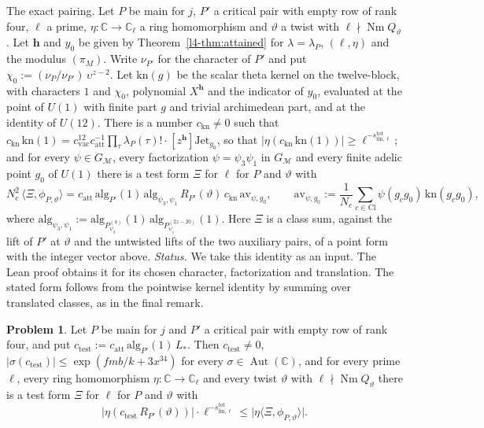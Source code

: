 \documentclass[reqno]{amsart}
\theoremstyle{definition}
\newtheorem{problem}{Problem}[section]
\theoremstyle{plain}
\theoremstyle{remark}
\newcommand{\C}{\mathbb{C}}
\newcommand{\Aut}{\operatorname{Aut}}
\newcommand{\Nm}{\operatorname{Nm}}
\newcommand{\alg}{\mathrm{alg}}
\newcommand{\stot}[1]{s^{\mathrm{tot}}_{\mathrm{fin},#1}}
\newcommand{\ctest}{c_{\mathrm{test}}}
\newcommand{\catt}{c_{\mathrm{att}}}
\newcommand{\cvac}{c_{\mathrm{vac}}}
\newcommand{\Jet}{\mathrm{Jet}}
\newcommand{\Cl}{\mathrm{Cl}}
\newcommand{\Gm}{G_{\mathcal M}}
\newcommand{\hb}{{\mathbf{h}}}
\begin{document}
The exact pairing.  Let \(P\) be main for \(j\), \(P'\) a critical pair with empty row of rank four, \(\ell\) a prime, \(\eta\colon\C\to\C_\ell\) a ring homomorphism and \(\vartheta\) a twist with \(\ell \nmid \Nm Q_\vartheta\).  Let \(\hb\) and \(y_0\) be given by Theorem~\ref{l4-thm:attained} for \(\lambda = \lambda_P\), \((\ell, \eta)\) and the modulus \((\pi_M)\).  Write \(\nu_{P'}\) for the character of \(P'\) and put \(\chi_0 := (\nu_P/\nu_{P'})\,\upsilon^{z-2}\).  Let \(\mathrm{kn}(g)\) be the scalar theta kernel on the twelve-block, with characters \(1\) and \(\chi_0\), polynomial \(X^\hb\) and the indicator of \(y_0\), evaluated at the point of \(U(1)\) with finite part \(g\) and trivial archimedean part, and at the identity of \(U(12)\).  There is a number \(c_{\mathrm{kn}} \ne 0\) such that \(c_{\mathrm{kn}}\,\mathrm{kn}(1) = \cvac^{12}\catt^{-1}\prod_\tau\lambda_P(\tau)!\cdot[z^\hb]\Jet_{y_0}\), so that \(\lvert\eta(c_{\mathrm{kn}}\,\mathrm{kn}(1))\rvert \ge \ell^{-\stot\ell}\); and for every \(\psi \in \Gm\), every factorization \(\psi = \psi_3\psi_1\) in \(\Gm\) and every finite adelic point \(g_0\) of \(U(1)\) there is a test form \(\Xi\) for \(\ell\) for \(P\) and \(\vartheta\) with
\[
  N_c^2\,\langle\Xi, \phi_{P,\vartheta}\rangle = \catt\,\alg_{P'}(1)\,\alg_{\psi_3,\psi_1}\,R_{P'}(\vartheta)\,c_{\mathrm{kn}}\,\mathrm{av}_{\psi,g_0},
  \qquad
  \mathrm{av}_{\psi,g_0} := \frac{1}{N_c}\sum_{c \in \Cl}\psi(g_cg_0)\,\mathrm{kn}(g_cg_0) ,
\]
where \(\alg_{\psi_3,\psi_1} := \alg_{P^{(4)}_{\psi_3}}(1)\,\alg_{P^{(2z-20)}_{\psi_1}}(1)\).  Here \(\Xi\) is a class sum, against the lift of \(P'\) at \(\vartheta\) and the untwisted lifts of the two auxiliary pairs, of a point form with the integer vector above.  \emph{Status.}  We take this identity as an input.  The Lean proof obtains it for its chosen character, factorization and translation.  The stated form follows from the pointwise kernel identity by summing over translated classes, as in the final remark.

\begin{problem}\label{pr:test-pairing}
Let \(P\) be main for \(j\) and \(P'\) a critical pair with empty row of rank four, and put \(\ctest := \catt\,\alg_{P'}(1)\,L_*\).  Then \(\ctest \ne 0\), \(\lvert\sigma(\ctest)\rvert \le \exp(fmb/k + 3x^{34})\) for every \(\sigma\in\Aut(\C)\), and for every prime \(\ell\), every ring homomorphism \(\eta\colon\C\to\C_\ell\) and every twist \(\vartheta\) with \(\ell\nmid\Nm Q_\vartheta\) there is a test form \(\Xi\) for \(\ell\) for \(P\) and \(\vartheta\) with
\begin{equation}\label{eq:test-pairing}
  \lvert\eta(\ctest\,R_{P'}(\vartheta))\rvert\cdot\ell^{-\stot\ell} \le \lvert\eta\langle\Xi, \phi_{P,\vartheta}\rangle\rvert .
\end{equation}
\end{problem}
\end{document}
